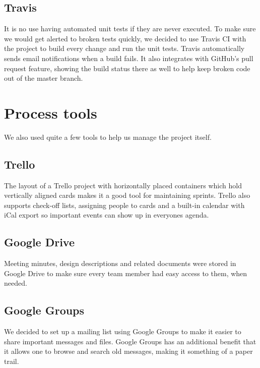 \subsection{Travis}

It is no use having automated unit tests if they are never executed. To make sure we would get alerted to broken tests quickly, we decided to use Travis CI with the project to build every change and run the unit tests. Travis automatically sends email notifications when a build fails. It also integrates with GitHub's pull request feature, showing the build status there as well to help keep broken code out of the master branch.  

\section{Process tools}

We also used quite a few tools to help us manage the project itself.

\subsection{Trello}

The layout of a Trello project with horizontally placed containers which hold vertically aligned cards makes it a good tool for maintaining sprints. Trello also supports check-off lists, assigning people to cards and a built-in calendar with iCal export so important events can show up in everyones agenda. 

\subsection{Google Drive}

Meeting minutes, design descriptions and related documents were stored in Google Drive to make sure every team member had easy access to them, when needed. 

\subsection{Google Groups}

We decided to set up a mailing list using Google Groups to make it easier to share important messages and files. Google Groups has an additional benefit that it allows one to browse and search old messages, making it something of a paper trail. 
